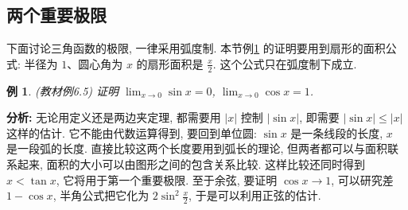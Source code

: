 \documentclass[UTF8,openany]{ctexbook}
\theoremstyle{chinesetextbook}
\newtheorem{example}{例}[section]
\begin{document}
\subsection{两个重要极限}
下面讨论三角函数的极限, 一律采用弧度制. 本节例\ref{ex:6-5} 的证明要用到扇形的面积公式: 半径为 $1$、圆心角为 $x$ 的扇形面积是 $\displaystyle\frac x2$. 这个公式只在弧度制下成立.
\begin{example}\label{ex:6-5}
\textnormal{(教材例6.5)} 证明 $\displaystyle\lim_{x\to0}\sin x=0$, $\displaystyle\lim_{x\to0}\cos x=1$.
\end{example}
\par\indent\textbf{分析:} 无论用定义还是两边夹定理, 都需要用 $|x|$ 控制 $|\sin x|$, 即需要 $|\sin x|\le|x|$ 这样的估计. 它不能由代数运算得到, 要回到单位圆: $\sin x$ 是一条线段的长度, $x$ 是一段弧的长度. 直接比较这两个长度要用到弧长的理论, 但两者都可以与面积联系起来, 面积的大小可以由图形之间的包含关系比较. 这样比较还同时得到 $x<\tan x$, 它将用于第一个重要极限. 至于余弦, 要证明 $\cos x\to1$, 可以研究差 $1-\cos x$, 半角公式把它化为 $\displaystyle2\sin^2\frac x2$, 于是可以利用正弦的估计.
\end{document}
